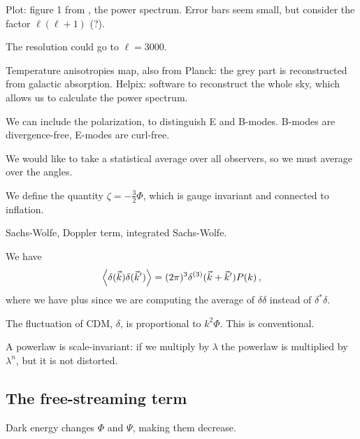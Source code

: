 \documentclass[main.tex]{subfiles}
\begin{document}

Plot: figure 1 from \cite[]{planckcollaborationPlanck2018Results2019}, the power spectrum. Error bars seem small, but consider the factor \(\ell (\ell+1)\) (?).

The resolution could go to \(\ell  = 3000\). 

Temperature anisotropies map, also from Planck: the grey part is reconstructed from galactic absorption. 
Helpix: software to reconstruct the whole sky, which allows us to calculate the power spectrum. 

We can include the polarization, to distinguish E and B-modes.
B-modes are divergence-free, E-modes are curl-free.

We would like to take a statistical average over all observers, so we must average over the angles. 

We define the quantity \(\zeta = - \frac{3}{2} \Phi \), which is gauge invariant and connected to inflation. 

Sachs-Wolfe, Doppler term, integrated Sachs-Wolfe.

We have 
%
\begin{align}
\expval{ \delta (\vec{k}) \delta (\vec{k}')} 
= (2 \pi )^3 \delta^{(3)} (\vec{k} + \vec{k}') P(k)
\,,
\end{align}
%
where we have plus since we are computing the average of \(\delta \delta \) instead of \(\delta^{*} \delta \).

The fluctuation of CDM, \(\delta \), is proportional to \(k^2 \Phi \). This is conventional. 

A powerlaw is scale-invariant: if we multiply by \(\lambda \) the powerlaw is multiplied by \(\lambda^{n}\), but it is not distorted.

\subsection{The free-streaming term}

Dark energy changes \(\Phi \) and \(\Psi \), making them decrease. 
\end{document}
